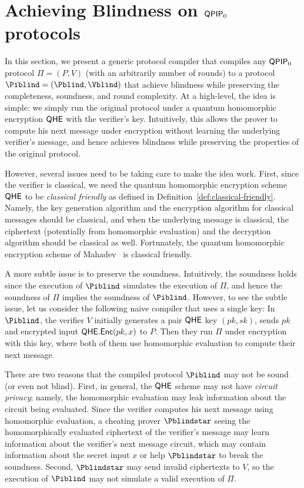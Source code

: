 \section{Achieving Blindness on $\operatorname{\mathsf{QPIP}}_0$ protocols}
\label{sec:BlindBQP2}

In this section, we present a generic protocol compiler that compiles any $\operatorname{\mathsf{QPIP}}_0$ protocol $\Pi = (P, V)$ (with an arbitrarily number of rounds) to a protocol $\Piblind = (\Pblind, \Vblind)$ that achieve blindness while preserving the completeness, soundness, and round complexity. At a high-level, the idea is simple: we simply run the original protocol under a quantum homomorphic encryption $\mathsf{QHE}$ with the verifier's key. Intuitively, this allows the prover to compute his next message under encryption without learning the underlying verifier's message, and hence achieves blindness while preserving the properties of the original protocol. 

However, several issues need to be taking care to make the idea work. First, since the verifier is classical, we need the quantum homomorphic encryption scheme $\mathsf{QHE}$ to be \emph{classical friendly} as defined in Definition~\ref{def:classical-friendly}. Namely, the key generation algorithm and the encryption algorithm for classical messages should be classical, and when the underlying message is classical, the ciphertext (potentially from homomorphic evaluation) and the decryption algorithm should be classical as well. Fortunately, the quantum homomorphic encryption scheme of Mahadev~\cite{mahadev_qfhe} is classical friendly.

A more subtle issue is to preserve the soundness. Intuitively, the soundness holds since the execution of $\Piblind$ simulates the execution of $\Pi$, and hence the soundness of $\Pi$ implies the soundness of $\Piblind$. However, to see the subtle issue, let us consider the following naive compiler that uses a single key: In $\Piblind$,  the verifier $V$ initially generates a pair $\mathsf{QHE}$ key $(pk, sk)$, sends $pk$ and encrypted input $\mathsf{QHE.Enc}(pk,x)$ to $P$. Then they run $\Pi$ under encryption with this key, where both of them use homomorphic evaluation to compute their next message. 

There are two reasons that the compiled protocol $\Piblind$ may not be sound (or even not blind). First, in general, the $\mathsf{QHE}$ scheme may not have \emph{circuit privacy}; namely, the homomorphic evaluation may leak information about the circuit being evaluated. Since the verifier computes his next message using homomorphic evaluation, a cheating prover $\Pblindstar$ seeing the homomorphically evaluated ciphertext of the verifier's message may learn information about the verifier's next message circuit, which may contain information about the secret input $x$ or help $\Pblindstar$ to break the soundness. Second, $\Pblindstar$ may send invalid ciphertexts to $V$, so the execution of $\Piblind$ may not simulate a valid execution of $\Pi$.


